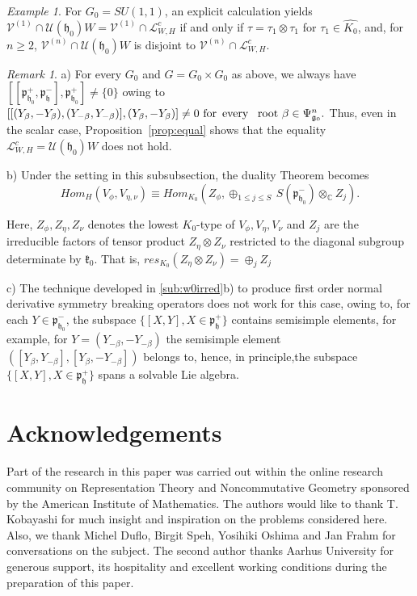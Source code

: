 \documentclass[12pt]{amsart}
\theoremstyle{definition}
\theoremstyle{remark}
\newtheorem{rmk}[thm]{Remark}
\newtheorem{examp}[thm]{Example}
\newcommand{\g}{\mathfrak{g}}
\newcommand{\h}{\mathfrak{h}}
\renewcommand{\k}{{\mathfrak k}}
\newcommand{\p}{\mathfrak p}
\newcommand{\C}{{\mathbb C}}
\numberwithin{equation}{section}
\begin{document}
\begin{examp} For $G_0=SU(1,1)$, an explicit calculation yields   $\mathcal V^{(1)} \cap \mathcal U(\h_0)W
=\mathcal V^{(1)} \cap \mathcal L_{W,H}^c$  if and only if $\tau =\tau_1 \otimes \tau_1$ for $\tau_1 \in \widehat{K_0}$, and,     for $n\geq 2$,  $\mathcal V^{(n)} \cap \mathcal U(\h_0)W
$ is disjoint to $\mathcal V^{(n)} \cap \mathcal L_{W,H}^c$.
\end{examp}
 \begin{rmk} \label{rmk:tensor2}a) For every $G_0$ and $G=G_0\times G_0$ as above,  we always have $[[\p_{\h_0}^+, \p_{\h}^-],\p_{\h_0}^+]\not=\{0\}$ owing to
  $[[(Y_{\beta}, -Y_{\beta}), (Y_{-\beta}, Y_{-\beta})], (Y_{\beta}, -Y_{\beta})]\not= 0  \, \, \text{for \,every \, root } \beta \in \Psi_{\g_0}^n.$ Thus, even in the scalar case, Proposition~\ref{prop:equal} shows that the equality  $\mathcal L_{W,H}^c = \mathcal U(\h_0)W  $ does not hold.

  b) Under the setting in this subsubsection, the duality Theorem becomes \begin{equation*} Hom_H( V_\phi, V_{\eta,\nu})\equiv Hom_{K_0}(Z_\phi, \oplus_{1\leq j \leq S} \, S(\p_{\h_0}^-)\otimes_{\C} Z_j). \end{equation*}
 \end{rmk}Here, $Z_\phi, Z_\eta,  Z_\nu$  denotes the lowest $K_0$-type of $V_\phi, V_\eta,V_\nu$ and $Z_j$ are the irreducible  factors of tensor product  $Z_\eta \otimes Z_\nu$ restricted to the diagonal subgroup determinate  by $\k_0$. That is,  $res_{K_0}(Z_\eta \otimes Z_\nu) =\oplus_j Z_j$


c) The technique developed in \ref{sub:w0irred}b) to produce first order normal derivative symmetry breaking operators does not work for this case, owing to,   for each $Y \in \p_{\h_0}^- $, the subspace  $\{[X,Y], X \in \p_\h^+ \}$ contains semisimple elements, for example, for $Y=(Y_{-\beta}, -Y_{-\beta})$ the semisimple element $([Y_\beta, Y_{-\beta}], [Y_\beta, -Y_{-\beta}])$ belongs to, hence, in principle,the subspace  $\{[X,Y], X \in \p_\h^+ \}$ spans a solvable Lie algebra.












   \section{Acknowledgements}
Part of the research in this paper was carried out within the online research community on Representation Theory and Noncommutative Geometry sponsored by the American Institute of Mathematics. The  authors would like to thank T. Kobayashi for much insight  and inspiration on the problems considered here. Also, we thank Michel Duflo, Birgit Speh, Yosihiki Oshima and Jan Frahm for conversations on the subject. The second author   thanks  Aarhus University for generous support, its hospitality and  excellent  working conditions during the preparation of this paper.
\end{document}
